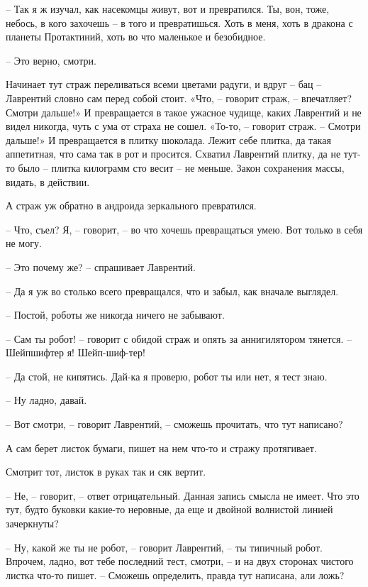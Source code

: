 \documentclass[ebook,oneside,final,openright]{memoir}
\begin{document}
– Так я ж изучал, как насекомцы живут, вот и превратился. Ты, вон, тоже, небось, в кого захочешь – в того и превратишься. Хоть в меня, хоть в дракона с планеты Протактиний, хоть во что маленькое и безобидное. \par
– Это верно, смотри. \par
\par
Начинает тут страж переливаться всеми цветами радуги, и вдруг – бац – Лаврентий словно сам перед собой стоит. «Что, – говорит страж, – впечатляет? Смотри дальше!» И превращается в такое ужасное чудище, каких Лаврентий и не видел никогда, чуть с ума от страха не сошел. «То-то, – говорит страж. – Смотри дальше!» И превращается в плитку шоколада. Лежит себе плитка, да такая аппетитная, что сама так в рот и просится. Схватил Лаврентий плитку, да не тут-то было – плитка килограмм сто весит – не меньше. Закон сохранения массы, видать, в действии. \par
\par
А страж уж обратно в андроида зеркального превратился. \par
– Что, съел? Я, – говорит, – во что хочешь превращаться умею. Вот только в себя не могу. \par
– Это почему же? – спрашивает Лаврентий.\par
– Да я уж во столько всего превращался, что и забыл, как вначале выглядел. \par
– Постой, роботы же никогда ничего не забывают. \par
– Сам ты робот! – говорит с обидой страж и опять за аннигилятором тянется. – Шейпшифтер я! Шейп-шиф-тер! \par
– Да стой, не кипятись. Дай-ка я проверю, робот ты или нет, я тест знаю. \par
– Ну ладно, давай. \par
– Вот смотри, – говорит Лаврентий, – сможешь прочитать, что тут написано? \par
А сам берет листок бумаги, пишет на нем что-то и стражу протягивает. \par
Смотрит тот, листок в руках так и сяк вертит. \par
– Не, – говорит, – ответ отрицательный. Данная запись смысла не имеет. Что это тут, будто буковки какие-то неровные, да еще и двойной волнистой линией зачеркнуты? \par
– Ну, какой же ты не робот, – говорит Лаврентий, – ты типичный робот. Впрочем, ладно, вот тебе последний тест, смотри, – и на двух сторонах чистого листка что-то пишет. – Сможешь определить, правда тут написана, али ложь? \par
\end{document}
